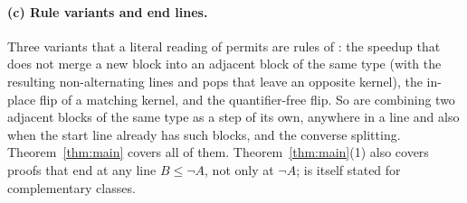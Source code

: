 \documentclass[11pt]{article}
\theoremstyle{definition}
\newcommand{\leanus}{\textunderscore\allowbreak}
\newcommand{\lean}[1]{\ifmmode\text{\ttfamily #1}\else{\ttfamily\let\_\leanus #1}\fi}
\begin{document}
\paragraph{(c) Rule variants and end lines.}
Three variants that a literal reading of \cite{W13} permits are rules of \lean{WStepX}: the speedup that does not merge a new block into an adjacent block of the same type (with the resulting non-alternating lines and pops that leave an opposite kernel), the in-place flip of a matching kernel, and the quantifier-free flip. So are combining two adjacent blocks of the same type as a step of its own, anywhere in a line and also when the start line already has such blocks, and the converse splitting. Theorem~\ref{thm:main} covers all of them. Theorem~\ref{thm:main}(1) also covers proofs that end at any line $B\le\neg A$, not only at $\neg A$; \cite[Theorem~6.6]{W13} is itself stated for complementary classes.
\end{document}
